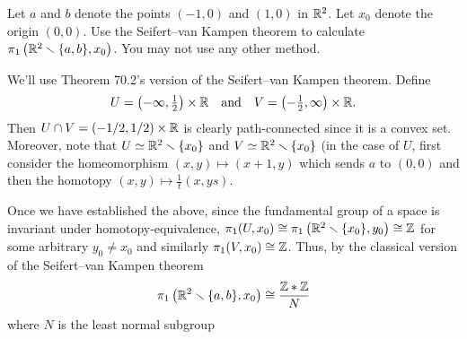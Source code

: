 \begin{problem}
  Let \(a\) and \(b\) denote the points \((-1,0)\) and \((1,0)\) in
  \(\mathbb{R}^2\). Let \(x_0\) denote the origin \((0,0)\). Use the Seifert--van
  Kampen theorem to calculate
  \(\pi_1\left(\mathbb{R}^2\smallsetminus\{a,b\},x_0\right)\). You may not use any
  other method.
\end{problem}
\begin{solution}
  We'll use Theorem 70.2's version of the Seifert--van Kampen
  theorem. Define
  \[
    U=\left(-\infty,\tfrac{1}{2}\right)\times\mathbb{R} \quad\text{and}\quad
    V=\left(-\tfrac{1}{2},\infty\right)\times\mathbb{R}.
  \]
  Then \(U\cap V=(-1/2,1/2)\times\mathbb{R}\) is clearly path-connected since it
  is a convex set. Moreover, note that \(U\simeq\mathbb{R}^2\smallsetminus\{x_0\}\)
  and \(V\simeq\mathbb{R}^2\smallsetminus\{x_0\}\) (in the case of \(U\), first
  consider the homeomorphism \((x,y)\mapsto(x+1,y)\) which sends \(a\) to
  \((0,0)\) and then the homotopy \((x,y)\mapsto\tfrac{1}{t}(x,ys)\).

  Once we have established the above, since the fundamental group of a
  space is invariant under homotopy-equivalence,
  \(\pi_1(U,x_0)\cong\pi_1\left(\mathbb{R}^2\smallsetminus\{x_0\},y_0\right)\cong\mathbb{Z}\)
  for some arbitrary \(y_0\neq x_0\) and similarly
  \(\pi_1(V,x_0)\cong\mathbb{Z}\). Thus, by the classical version of the
  Seifert--van Kampen theorem
  \[
    \pi_1\left(\mathbb{R}^2\smallsetminus\{a,b\},x_0\right)\cong
    \frac{\mathbb{Z}*\mathbb{Z}}{N}
  \]
  where \(N\) is the least normal subgroup
\end{solution}

